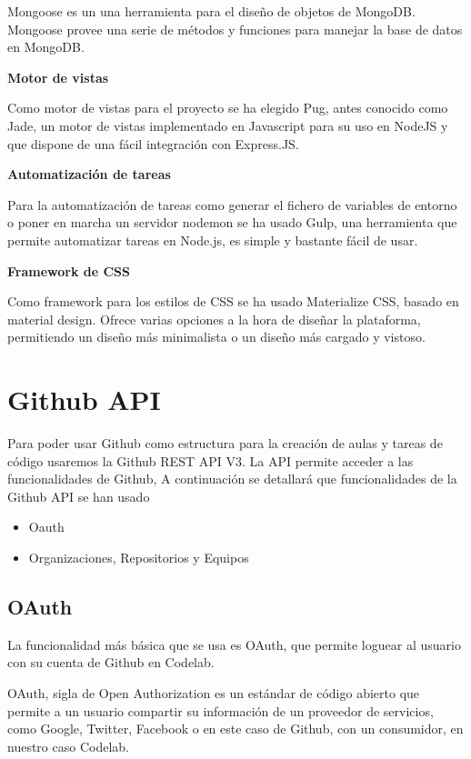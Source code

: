 Mongoose es un una herramienta para el diseño de objetos de MongoDB. 
Mongoose provee una serie de métodos y funciones para manejar la base de datos en MongoDB.

{\bf Motor de vistas}

Como motor de vistas para el proyecto se ha elegido Pug, antes conocido como Jade, un motor de vistas implementado en Javascript para su uso en NodeJS y que dispone de una fácil integración con Express.JS. 

{\bf Automatización de tareas}

Para la automatización de tareas como generar el fichero de variables de entorno o poner en marcha un servidor nodemon se ha usado Gulp, una herramienta que permite automatizar tareas en Node.js, es simple y bastante fácil de usar.

{\bf Framework de CSS}

Como framework para los estilos de CSS se ha usado Materialize CSS, basado en material design. Ofrece varias opciones a la hora de diseñar la plataforma, permitiendo un diseño más minimalista o un diseño más cargado y vistoso.

\section{Github API}
\label{3:sec2}

Para poder usar Github como estructura para la creación de aulas y tareas de código usaremos la Github REST API V3.
La API permite acceder a las funcionalidades de Github, A continuación se detallará que funcionalidades de la Github API se han usado

\begin{itemize}
  \item Oauth
  \item Organizaciones, Repositorios y Equipos
\end{itemize}

\subsection{OAuth}
\label{3:2:1}

La funcionalidad más básica que se usa es OAuth, que permite loguear al usuario con su cuenta de Github en
Codelab.

OAuth, sigla de Open Authorization es un estándar de código abierto que permite a un usuario compartir su información de un proveedor de servicios, como Google, Twitter, Facebook o en este caso de Github, con un consumidor, en nuestro caso Codelab.

